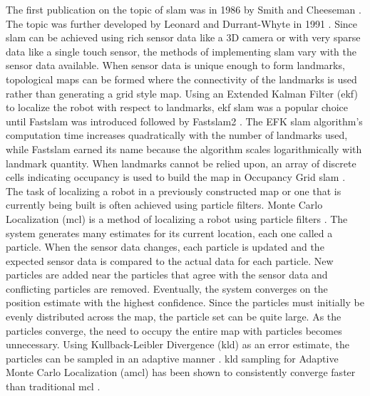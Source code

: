 The first publication on the topic of \acrshort{slam} was in 1986 by Smith and Cheeseman \cite{smith1986,smith1990}. The topic was further developed by Leonard and Durrant-Whyte in 1991 \cite{len1991}. Since \acrshort{slam} can be achieved using rich sensor data like a 3D camera or with very sparse data like a single touch sensor, the methods of implementing \acrshort{slam} vary with the sensor data available. When sensor data is unique enough to form landmarks, topological maps can be formed where the connectivity of the landmarks is used rather than generating a grid style map. Using an Extended Kalman Filter (\acrshort{ekf}) to localize the robot with respect to landmarks, \acrshort{ekf} \acrshort{slam} \cite{ekfslam} was a popular choice until Fast\acrshort{slam} \cite{fastslam} was introduced followed by Fast\acrshort{slam}2 \cite{fastslam2} . The EFK \acrshort{slam} algorithm's computation time increases quadratically with the number of landmarks used, while Fast\acrshort{slam} earned its name because the algorithm scales logarithmically with landmark quantity. When landmarks cannot be relied upon, an array of discrete cells indicating occupancy is used to build the map in Occupancy Grid \acrshort{slam} \cite{graphslam}.\\

The task of localizing a robot in a previously constructed map or one that is currently being built is often achieved using particle filters. Monte Carlo Localization (\acrshort{mcl}) is a method of localizing a robot using particle filters \cite{mcl}. The system generates many estimates for its current location, each one called a particle. When the sensor data changes, each particle is updated and the expected sensor data is compared to the actual data for each particle. New particles are added near the particles that agree with the sensor data and conflicting particles are removed. Eventually, the system converges on the position estimate with the highest confidence. Since the particles must initially be evenly distributed across the map, the particle set can be quite large. As the particles converge, the need to occupy the entire map with particles becomes unnecessary. Using Kullback-Leibler Divergence (\acrshort{kld}) as an error estimate, the particles can be sampled in an adaptive manner \cite{kld,amcl}. \acrshort{kld} sampling for Adaptive Monte Carlo Localization (\acrshort{amcl}) has been shown to consistently converge faster than traditional \acrshort{mcl} \cite{kldproof}.\\

